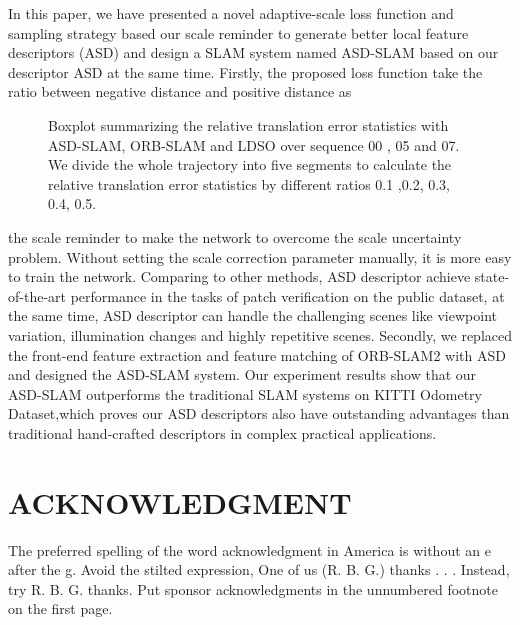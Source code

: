 \documentclass[letterpaper, 10 pt, conference]{ieeeconf}  %
\begin{document}
In this paper, we have presented a novel adaptive-scale loss function and  sampling strategy based our scale reminder to generate better local feature descriptors (ASD) and design a SLAM system named ASD-SLAM based on our descriptor ASD at the same time. Firstly, the proposed loss function take  the ratio between  negative distance and positive distance as
\begin{figure}[H]
\centering
{}%

%
\caption{Boxplot summarizing the relative translation error statistics with ASD-SLAM, ORB-SLAM and LDSO over sequence 00 , 05 and 07. We divide the whole trajectory into five segments to  calculate the relative translation error statistics by different ratios 0.1 ,0.2, 0.3, 0.4, 0.5. } 
\end{figure}

the scale reminder to make the network to overcome the scale uncertainty problem. Without setting the scale correction parameter manually, it is more easy to train the network. Comparing to other methods, ASD descriptor achieve state-of-the-art performance in the tasks of patch verification on the public dataset, at the same time, ASD descriptor can handle the challenging scenes like viewpoint variation, illumination changes and highly repetitive scenes. Secondly, we replaced the front-end feature extraction and feature matching of ORB-SLAM2 with ASD and designed the ASD-SLAM system. Our experiment results show that our ASD-SLAM outperforms the traditional SLAM systems on KITTI Odometry Dataset,which proves our ASD descriptors also have outstanding advantages than traditional hand-crafted descriptors in complex practical applications.




\section*{ACKNOWLEDGMENT}

The preferred spelling of the word acknowledgment in America is without an e after the g. Avoid the stilted expression, One of us (R. B. G.) thanks . . .  Instead, try R. B. G. thanks. Put sponsor acknowledgments in the unnumbered footnote on the first page.
\end{document}
